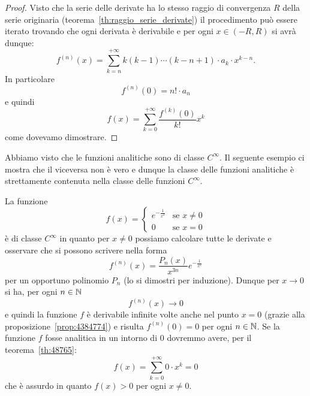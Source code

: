 \begin{proof}
Visto che la serie delle derivate ha lo stesso raggio di convergenza $R$
della serie originaria (teorema~\ref{th:raggio_serie_derivate})
il procedimento può essere iterato trovando che ogni derivata è derivabile
e per ogni $x\in (-R,R)$ si avrà dunque:
\[
  f^{(n)}(x) = \sum_{k=n}^{+\infty}k (k-1) \cdots (k-n+1) \cdot a_k \cdot x^{k-n}.
\]
In particolare
\[
  f^{(n)}(0) = n! \cdot a_n
\]
e quindi
\[
  f(x) = \sum_{k=0}^{+\infty} \frac{f^{(k)}(0)}{k!} x^k
\]
come dovevamo dimostrare.
\end{proof}

Abbiamo visto che le funzioni analitiche sono di classe $C^\infty$. Il seguente
esempio ci mostra che il viceversa non è vero e dunque la classe delle funzioni
analitiche è strettamente contenuta nella classe delle funzioni $C^\infty$.

\begin{example}
La funzione
\[
  f(x) =
  \begin{cases}
    e^{-\frac 1 {x^2}} & \text{se $x\neq 0$}\\
    0 & \text{se $x=0$}
  \end{cases}
\]
è di classe $C^\infty$ in quanto per $x\neq 0$ possiamo calcolare
tutte le derivate e osservare che si possono scrivere nella forma
\[
  f^{(n)}(x) = \frac{P_n(x)}{x^{3n}}e^{-\frac 1 {x^2}}
\]
per un opportuno polinomio $P_n$ (lo si dimostri per induzione).
Dunque per $x\to 0$ si ha, per ogni $n\in {\mathbb N}$
\[
  f^{(n)}(x) \to 0
\]
e quindi la funzione $f$ è derivabile infinite volte anche nel
punto $x=0$ (grazie alla proposizione~\ref{prop:4384774})
e risulta $f^{(n)}(0) = 0$ per ogni $n\in {\mathbb N}$. Se la funzione $f$
fosse analitica in un intorno di $0$ dovremmo avere, per il teorema~\ref{th:48765}:
\[
  f(x) = \sum_{k=0}^{+\infty} 0\cdot x^k = 0
\]
che è assurdo in quanto $f(x)>0$ per ogni $x\neq 0$.
\end{example}


